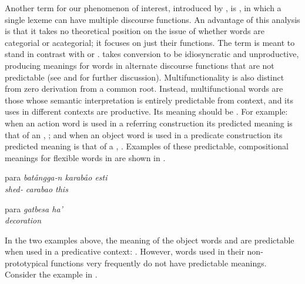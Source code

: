 Another term for our phenomenon of interest, introduced by \parencite{Lier2012}, is , in which a single lexeme can have multiple discourse functions. An advantage of this analysis is that it takes no theoretical position on the issue of whether words are categorial or acategorial; it focuses on just their functions. The term  is meant to stand in contrast with  or . \citeauthor{Lier2012} takes conversion to be idiosyncratic and unproductive, producing meanings for words in alternate discourse functions that are not predictable (see  and  for further discussion). Multifunctionality is also distinct from zero derivation from a common root. Instead, multifunctional words are those whose semantic interpretation is entirely predictable from context, and its uses in different contexts are productive. Its meaning should be . For example: when an action word is used in a referring construction its predicted meaning is that of an , ; and when an object word is used in a predicate construction its predicted meaning is that of a , . Examples of these predictable, compositional meanings for flexible words in  are shown in .

\begin{exe}

  \ex\label{ex:2.5}
  \begin{xlist}

    \ex\label{ex:2.5a}
    \gll para     \em{batångga‑n}     karabåo esti\\
          \em{shed‑} carabao this\\

    \ex\label{ex:2.5b}
    \gll para     \em{gatbesa}    ha'\\
          \em{decoration} \\

  \end{xlist}

\end{exe}

\noindent In the two examples above, the meaning of the object words  and  are predictable when used in a predicative context: . However, words used in their non-prototypical functions very frequently do not have predictable meanings. Consider the example in .

